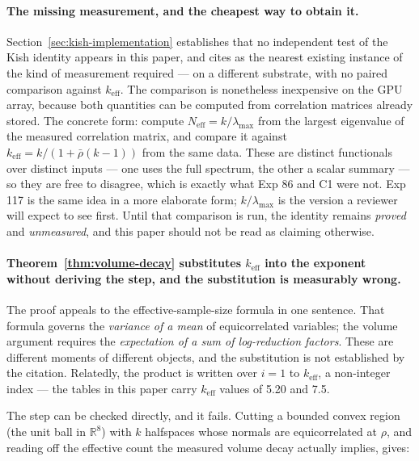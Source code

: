 \documentclass[11pt,a4paper]{article}
\theoremstyle{definition}
\theoremstyle{remark}
\newcommand{\keff}{k_{\text{eff}}}
\begin{document}
\paragraph{The missing measurement, and the cheapest way to obtain it.}
Section~\ref{sec:kish-implementation} establishes that no independent test of the Kish identity
appears in this paper, and cites \cite{crc2026} as the nearest existing instance of the kind of
measurement required --- on a different substrate, with no paired comparison against $\keff$.
The comparison is nonetheless inexpensive on the GPU array, because both quantities can be
computed from correlation matrices already stored. The concrete form: compute
$N_{\text{eff}} = k/\lambda_{\max}$ from the largest eigenvalue of the measured correlation
matrix, and compare it against $\keff = k/(1+\bar{\rho}(k-1))$ from the same data. These are
distinct functionals over distinct inputs --- one uses the full spectrum, the other a scalar
summary --- so they are free to disagree, which is exactly what Exp 86 and C1 were not. Exp 117
is the same idea in a more elaborate form; $k/\lambda_{\max}$ is the version a reviewer will
expect to see first. Until that comparison is run, the identity remains \emph{proved} and
\emph{unmeasured}, and this paper should not be read as claiming otherwise.

\paragraph{Theorem~\ref{thm:volume-decay} substitutes $\keff$ into the exponent without deriving the step, and the substitution is measurably wrong.}
The proof appeals to the effective-sample-size formula in one sentence. That formula governs the
\emph{variance of a mean} of equicorrelated variables; the volume argument requires the
\emph{expectation of a sum of log-reduction factors}. These are different moments of different
objects, and the substitution is not established by the citation. Relatedly, the product is
written over $i = 1$ to $\keff$, a non-integer index --- the tables in this paper carry $\keff$
values of 5.20 and 7.5.

The step can be checked directly, and it fails. Cutting a bounded convex region (the unit ball
in $\mathbb{R}^8$) with $k$ halfspaces whose normals are equicorrelated at $\rho$, and reading
off the effective count the measured volume decay actually implies, gives:
\end{document}
